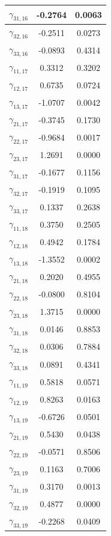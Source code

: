 \documentclass[a4paper, 12pt, openany, oneside, brazil]{abntex2}
\begin{document}
\begin{apendicesenv}
\begin{longtable}{|c|c|c|}
	\hline
	$\gamma_{31,16}$ & -0.2764 & 0.0063 \\
	\hline
	$\gamma_{32,16}$ & -0.2511 & 0.0273 \\
	\hline
	$\gamma_{33,16}$ & -0.0893 & 0.4314 \\
	\hline
	$\gamma_{11,17}$ & 0.3312 & 0.3202 \\
	\hline
	$\gamma_{12,17}$ & 0.6735 & 0.0724 \\
	\hline
	$\gamma_{13,17}$ & -1.0707 & 0.0042 \\
	\hline
	$\gamma_{21,17}$ & -0.3745 & 0.1730 \\
	\hline
	$\gamma_{22,17}$ & -0.9684 & 0.0017 \\
	\hline
	$\gamma_{23,17}$ & 1.2691 & 0.0000 \\
	\hline
	$\gamma_{31,17}$ & -0.1677 & 0.1156 \\
	\hline
	$\gamma_{32,17}$ & -0.1919 & 0.1095 \\
	\hline
	$\gamma_{33,17}$ & 0.1337 & 0.2638 \\
	\hline
	$\gamma_{11,18}$ & 0.3750 & 0.2505 \\
	\hline
	$\gamma_{12,18}$ & 0.4942 & 0.1784 \\
	\hline
	$\gamma_{13,18}$ & -1.3552 & 0.0002 \\
	\hline
	$\gamma_{21,18}$ & 0.2020 & 0.4955 \\
	\hline
	$\gamma_{22,18}$ & -0.0800 & 0.8104 \\
	\hline
	$\gamma_{23,18}$ & 1.3715 & 0.0000 \\
	\hline
	$\gamma_{31,18}$ & 0.0146 & 0.8853 \\
	\hline
	$\gamma_{32,18}$ & 0.0306 & 0.7884 \\
	\hline
	$\gamma_{33,18}$ & 0.0891 & 0.4341 \\
	\hline
	$\gamma_{11,19}$ & 0.5818 & 0.0571 \\
	\hline
	$\gamma_{12,19}$ & 0.8263 & 0.0163 \\
	\hline
	$\gamma_{13,19}$ & -0.6726 & 0.0501 \\
	\hline
	$\gamma_{21,19}$ & 0.5430 & 0.0438 \\
	\hline
	$\gamma_{22,19}$ & -0.0571 & 0.8506 \\
	\hline
	$\gamma_{23,19}$ & 0.1163 & 0.7006 \\
	\hline
	$\gamma_{31,19}$ & 0.3170 & 0.0013 \\
	\hline
	$\gamma_{32,19}$ & 0.4877 & 0.0000 \\
	\hline
	$\gamma_{33,19}$ & -0.2268 & 0.0409 \\

\end{longtable}
\end{apendicesenv}
\end{document}
